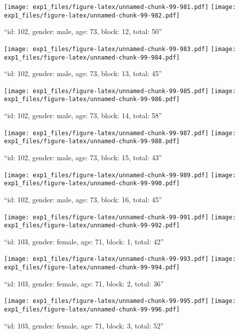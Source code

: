 \documentclass[,]{article}
\begin{document}
\texttt{[image: exp1\_files/figure-latex/unnamed-chunk-99-981.pdf]}
\texttt{[image: exp1\_files/figure-latex/unnamed-chunk-99-982.pdf]}

\newpage
[1] 

``id: 102, gender: male, age: 73, block: 12, total: 50''

\texttt{[image: exp1\_files/figure-latex/unnamed-chunk-99-983.pdf]}
\texttt{[image: exp1\_files/figure-latex/unnamed-chunk-99-984.pdf]}

\newpage
[1] 

``id: 102, gender: male, age: 73, block: 13, total: 45''

\texttt{[image: exp1\_files/figure-latex/unnamed-chunk-99-985.pdf]}
\texttt{[image: exp1\_files/figure-latex/unnamed-chunk-99-986.pdf]}

\newpage
[1] 

``id: 102, gender: male, age: 73, block: 14, total: 58''

\texttt{[image: exp1\_files/figure-latex/unnamed-chunk-99-987.pdf]}
\texttt{[image: exp1\_files/figure-latex/unnamed-chunk-99-988.pdf]}

\newpage
[1] 

``id: 102, gender: male, age: 73, block: 15, total: 43''

\texttt{[image: exp1\_files/figure-latex/unnamed-chunk-99-989.pdf]}
\texttt{[image: exp1\_files/figure-latex/unnamed-chunk-99-990.pdf]}

\newpage
[1] 

``id: 102, gender: male, age: 73, block: 16, total: 45''

\texttt{[image: exp1\_files/figure-latex/unnamed-chunk-99-991.pdf]}
\texttt{[image: exp1\_files/figure-latex/unnamed-chunk-99-992.pdf]}

\newpage
[1] 

``id: 103, gender: female, age: 71, block: 1, total: 42''

\texttt{[image: exp1\_files/figure-latex/unnamed-chunk-99-993.pdf]}
\texttt{[image: exp1\_files/figure-latex/unnamed-chunk-99-994.pdf]}

\newpage
[1] 

``id: 103, gender: female, age: 71, block: 2, total: 36''

\texttt{[image: exp1\_files/figure-latex/unnamed-chunk-99-995.pdf]}
\texttt{[image: exp1\_files/figure-latex/unnamed-chunk-99-996.pdf]}

\newpage
[1] 

``id: 103, gender: female, age: 71, block: 3, total: 52''
\end{document}
